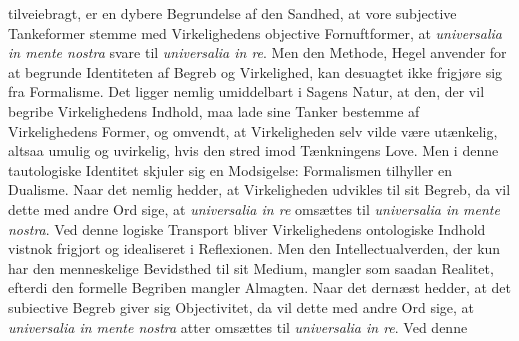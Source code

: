 \documentclass[12pt]{book}
\newcommand{\opage}[1]{\marginnote{\footnotesize\textit{[#1]}}}
\begin{document}
tilveiebragt, er en dybere Begrundelse af den Sandhed, at vore subjective Tankeformer
stemme med Virkelighedens objective Fornuftformer, at \textit{universalia in mente
nostra} svare til \textit{universalia in re}. Men den Methode, Hegel anvender for at
begrunde Identiteten af Begreb og Virkelighed, kan desuagtet ikke frigjøre sig fra
Formalisme. Det ligger nemlig umiddelbart i Sagens Natur, at den, der vil begribe
Virkelighedens Indhold, maa lade sine Tanker bestemme af Virkelighedens Former, og
omvendt, at Virkeligheden selv vilde være utænkelig, altsaa umulig og uvirkelig, hvis
den stred imod Tænkningens Love. Men i denne tautologiske Identitet skjuler sig en
Modsigelse: Formalismen tilhyller en Dualisme. Naar det nemlig hedder, at Virkeligheden
udvikles til sit Begreb, da vil dette med andre Ord sige, at \textit{universalia in re}
omsættes til \textit{universalia in mente nostra}. Ved denne logiske Transport bliver
Virkelighedens ontologiske Indhold vistnok frigjort og idealiseret i Reflexionen. Men
den Intellectualverden, der kun har den menneskelige Bevidsthed til sit Medium, mangler
som saadan Realitet, efterdi den formelle Begriben mangler Almagten. Naar det dernæst
hedder, at det subiective Begreb giver sig Objectivitet, da vil dette med andre Ord
sige, at \textit{universalia in mente nostra} atter omsættes til
\textit{universalia in re}. Ved denne
\opage{178} %
%
%
\end{document}
